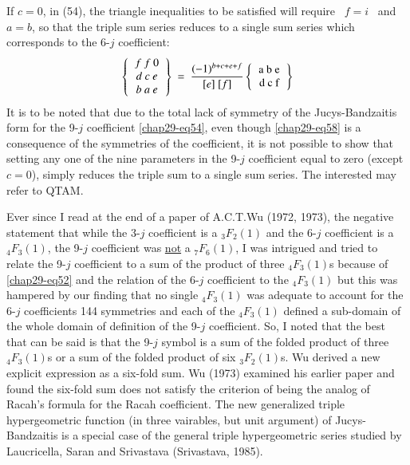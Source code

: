 If $c=0$, in (54), the triangle inequalities to be satisfied will require \ $f=i$ \ and \ $a=b$, so that the triple sum series reduces to a single sum series which corresponds to the 6-$j$ coefficient:
\begin{equation}
\left\{
\begin{tabular}{c}
$f \ f \ 0$\\  
$d \ c\ e$\\ 
$b \ a \ e$\\ 
\end{tabular} 
\right\} \
=\ \frac{(-1)^{b+c+e+f}}{[e]\ [f]}
\left\{
\begin{tabular} {c} 
a\ b\ e\\ 
d\ c\ f \\ 
\end{tabular} 
\right\} \label{chap29-eq58}
\end{equation}
It is to be noted that due to the total lack of symmetry of the Jucys-Bandzaitis form for the 9-$j$ coefficient \eqref{chap29-eq54}, even though \eqref{chap29-eq58} is a consequence of the symmetries of the coefficient, it is not possible to show that setting any one of the nine parameters in the 9-$j$ coefficient equal to zero (except $c=0$), simply reduces the triple sum to a single sum series. The interested may refer to QTAM.

Ever since I read at the end of a paper of A.C.T.Wu (1972, 1973), the negative statement that while the 3-$j$ coefficient is a $_3F_2(1)$ and the 6-$j$ coefficient is a $_4F_3(1)$, the 9-$j$ coefficient was \underline{not} a $_7F_6(1)$, I was intrigued and tried to relate the 9-$j$ coefficient to a sum of the product of three $_4F_3(1)$s because of \eqref{chap29-eq52} and the relation of the 6-$j$ coefficient to the $_4F_3(1)$ but this was hampered by our finding that no single $_4F_3(1)$ was adequate to account for the 6-$j$ coefficients 144 symmetries and each of the $_4F_3(1)$ defined a sub-domain of the whole domain of definition of the  9-$j$ coefficient. So, I noted that the best that can be said is that the 9-$j$ symbol is a sum of the folded product of three $_4F_3(1)$s or a sum of the folded product of six $_3F_2(1)$s. Wu derived a new explicit expression as a six-fold sum. Wu (1973) examined his earlier paper and found the six-fold sum does not satisfy the criterion of being the analog of Racah's formula for the Racah coefficient. The new generalized triple hypergeometric function (in three vairables, but unit argument) of Jucys-Bandzaitis is a special case of the general triple hypergeometric series studied by Laucricella, Saran and Srivastava (Srivastava, 1985).


